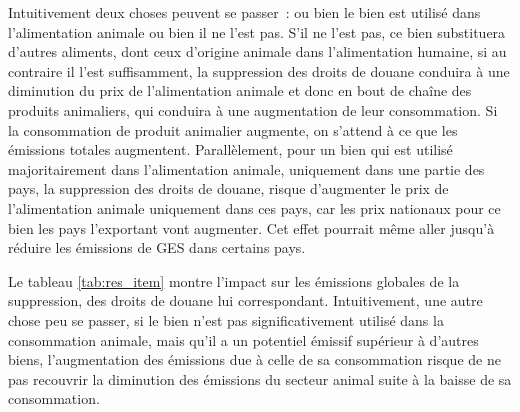 Intuitivement deux choses peuvent se passer~: ou bien le bien est utilisé dans l'alimentation animale ou bien il ne l'est pas. S'il ne l'est pas, ce bien substituera d'autres aliments, dont ceux d'origine animale dans l'alimentation humaine, si au contraire il l'est suffisamment, la suppression des droits de douane conduira à une diminution du prix de l'alimentation animale et donc en bout de chaîne des produits animaliers, qui conduira à une augmentation de leur consommation. Si la consommation de produit animalier augmente, on s'attend à ce que les émissions totales augmentent. Parallèlement, pour un bien qui est utilisé majoritairement dans l'alimentation animale, uniquement dans une partie des pays, la suppression des droits de douane, risque d'augmenter le prix de l'alimentation animale uniquement dans ces pays, car les prix nationaux pour ce bien les pays l'exportant vont augmenter. Cet effet pourrait même aller jusqu'à réduire les émissions de GES dans certains pays.

Le tableau \ref{tab:res_item} montre l'impact sur les émissions globales de la suppression, des droits de douane lui correspondant. Intuitivement, une autre chose peu se passer, si le bien n'est pas significativement utilisé dans la consommation animale, mais qu'il a un potentiel émissif supérieur à d'autres biens, l'augmentation des émissions due à celle de sa consommation risque de ne pas recouvrir la diminution des émissions du secteur animal suite à la baisse de sa consommation.

